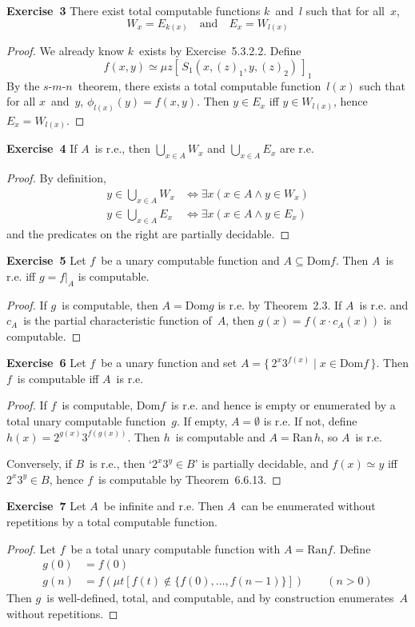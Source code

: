 \documentclass[letterpaper]{article}
\newcommand{\exercise}[2][]{\noindent\textbf{Exercise~{#2}}\ifthenelse{\isempty{#1}}{\textbf{.}}{ ({#1})\textbf{.}}}
\newcommand{\dom}{\mathrm{Dom}}
\newcommand{\ran}{\mathrm{Ran}}
\newcommand{\bigunion}{\bigcup}
\newcommand{\smn}{$s$-$m$-$n$}
\theoremstyle{plain}
\theoremstyle{definition}
\theoremstyle{remark}
\begin{document}
\exercise{3}
There exist total computable functions $k$~and~$l$ such that for all~$x$,
$$W_x=E_{k(x)}\quad\text{and}\quad E_x=W_{l(x)}$$
\begin{proof}
We already know $k$~exists by Exercise~5.3.2.2. Define
$$f(x,y)\simeq\mu z[\,S_1(x,(z)_1,y,(z)_2)\,]_1$$
By the \smn\ theorem, there exists a total computable function~$l(x)$ such that for all $x$~and~$y$, $\phi_{l(x)}(y)=f(x,y)$. Then $y\in E_x$ iff $y\in W_{l(x)}$, hence $E_x=W_{l(x)}$.
\end{proof}

\exercise{4}
If $A$~is r.e., then $\bigunion_{x\in A}W_x$ and $\bigunion_{x\in A}E_x$ are r.e.
\begin{proof}
By definition,
\begin{align*}
y\in\bigunion_{x\in A}W_x&\iff \exists x(x\in A\land y\in W_x)\\
y\in\bigunion_{x\in A}E_x&\iff \exists x(x\in A\land y\in E_x)
\end{align*}
and the predicates on the right are partially decidable.
\end{proof}

\exercise{5}
Let $f$~be a unary computable function and $A\subseteq\dom f$. Then $A$~is r.e. iff $g=f|_A$ is computable.
\begin{proof}
If $g$~is computable, then $A=\dom g$ is r.e. by Theorem~2.3. If $A$~is r.e. and $c_A$~is the partial characteristic function of~$A$, then $g(x)=f(x\cdot c_A(x))$ is computable.
\end{proof}

\exercise{6}
Let $f$~be a unary function and set $A=\{\,2^x3^{f(x)}\mid x\in\dom f\,\}$. Then $f$~is computable iff $A$~is r.e.
\begin{proof}
If $f$~is computable, $\dom f$~is r.e. and hence is empty or enumerated by a total unary computable function~$g$. If empty, $A=\emptyset$ is r.e. If not, define $h(x)=2^{g(x)}3^{f(g(x))}$. Then $h$~is computable and $A=\ran\,h$, so $A$~is r.e.

Conversely, if $B$~is r.e., then `$2^x3^y\in B$' is partially decidable, and $f(x)\simeq y$ iff $2^x3^y\in B$, hence $f$~is computable by Theorem~6.6.13.
\end{proof}

\exercise{7}
Let $A$~be infinite and r.e. Then $A$~can be enumerated without repetitions by a total computable function.
\begin{proof}
Let $f$~be a total unary computable function with $A=\ran f$. Define
\begin{align*}
g(0)&=f(0)\\
g(n)&=f(\mu t[f(t)\not\in\{f(0),\ldots,f(n-1)\}])\qquad(n>0)
\end{align*}
Then $g$~is well-defined, total, and computable, and by construction enumerates~$A$ without repetitions.
\end{proof}
\end{document}
